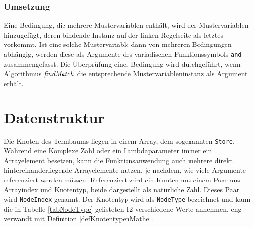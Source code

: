 \subsubsection{Umsetzung}
Eine Bedingung, die mehrere Mustervariablen enthält, wird der Mustervariablen hinzugefügt, deren bindende Instanz auf der linken Regelseite als letztes vorkommt. Ist eine solche Mustervariable dann von mehreren Bedingungen abhängig, werden diese als Argumente des variadischen Funktionssymbols \verb|and| zusammengefasst. Die Überprüfung einer Bedingung wird durchgeführt, wenn Algorithmus $\mathit{findMatch}$ die entsprechende Mustervariableninstanz als Argument erhält. 





\section{Datenstruktur}
Die Knoten des Termbaums liegen in einem Array, dem sogenannten \verb|Store|. Während eine Komplexe Zahl oder ein Lambdaparameter immer ein Arrayelement besetzen, kann die Funktionsanwendung auch mehrere direkt hintereinanderliegende Arrayelemente nutzen, je nachdem, wie viele Argumente referenziert werden müssen. Referenziert wird ein Knoten aus einem Paar aus Arrayindex und Knotentyp, beide dargestellt als natürliche Zahl. Dieses Paar wird \verb|NodeIndex| genannt. Der Knotentyp wird als \verb|NodeType| bezeichnet und kann die in Tabelle \ref{tabNodeType} gelisteten 12 verschiedene Werte annehmen, eng verwandt mit Definition \ref{defKnotentypenMathe}.

